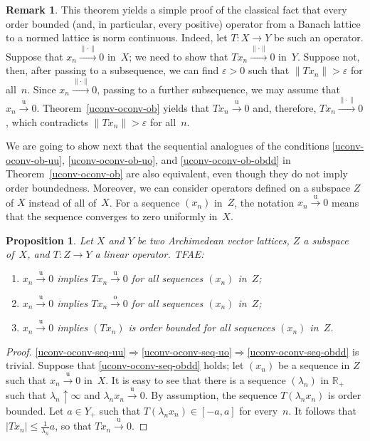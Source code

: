 \documentclass[12pt]{amsart}
\theoremstyle{plain}
\newtheorem{proposition}[theorem]{Proposition}
\theoremstyle{definition}
\newtheorem{remark}[theorem]{Remark}
\newcommand{\abs}[1]{\lvert#1\rvert}
\newcommand{\norm}[1]{\lVert#1\rVert}
\newcommand{\goeso}{\xrightarrow{\mathrm{o}}}	%
\newcommand{\goesu}{\xrightarrow{\mathrm{u}}} %
\newcommand{\goesnorm}{\xrightarrow{\norm{\cdot}}} %
\renewcommand{\le}{\leqslant}
\begin{document}
\begin{remark}\label{uc-bdd}
  This theorem yields a simple proof of the classical fact that every
  order bounded (and, in particular, every positive) operator from a
  Banach lattice to a normed lattice is norm continuous. Indeed, let
  $T\colon X\to Y$ be such an operator. Suppose that $x_n\goesnorm 0$
  in~$X$; we need to show that $Tx_n\goesnorm 0$ in~$Y$. Suppose not,
  then, after passing to a subsequence, we can find $\varepsilon>0$
  such that $\norm{Tx_n}>\varepsilon$ for all~$n$. Since
  $x_n\goesnorm 0$, passing to a further subsequence, we may assume
  that $x_n\goesu 0$. Theorem~\ref{uconv-oconv-ob} yields that
  $Tx_n\goesu 0$ and, therefore, $Tx_n\goesnorm 0$, which contradicts
  $\norm{Tx_n}>\varepsilon$ for all~$n$.
\end{remark}

We are going to show next that the sequential analogues of the
conditions \eqref{uconv-oconv-ob-uu}, \eqref{uconv-oconv-ob-uo}, and
\eqref{uconv-oconv-ob-obdd} in Theorem~\ref{uconv-oconv-ob} are also
equivalent, even though they do not imply order boundedness. Moreover,
we can consider operators defined on a subspace $Z$ of $X$ instead of
all of~$X$. For a sequence $(x_n)$ in~$Z$, the notation $x_n\goesu 0$
means that the sequence converges to zero uniformly in~$X$.

\begin{proposition}\label{uconv-oconv-seq}
  Let $X$ and $Y$ be two Archimedean vector lattices, $Z$ a subspace
  of~$X$, and $T\colon Z\to Y$ a linear operator. TFAE:
  \begin{enumerate}
  \item\label{uconv-oconv-seq-uu} $x_n\goesu 0$ implies
    $Tx_n\goesu 0$ for all sequences $(x_n)$ in~$Z$;
  \item\label{uconv-oconv-seq-uo} $x_n\goesu 0$ implies
    $Tx_n\goeso 0$ for all sequences $(x_n)$ in~$Z$;
  \item\label{uconv-oconv-seq-obdd} $x_n\goesu 0$ implies
    $(Tx_n)$ is order bounded for all sequences $(x_n)$ in~$Z$.
  \end{enumerate}
\end{proposition}

\begin{proof}
  \eqref{uconv-oconv-seq-uu}$\Rightarrow$\eqref{uconv-oconv-seq-uo}$\Rightarrow$\eqref{uconv-oconv-seq-obdd}
  is trivial. Suppose that \eqref{uconv-oconv-seq-obdd} holds; let
  $(x_n)$ be a sequence in $Z$ such that $x_n\goesu 0$ in~$X$. It is easy
  to see that there is a sequence $(\lambda_n)$ in $\mathbb R_+$ such
  that $\lambda_n\uparrow\infty$ and $\lambda_nx_n\goesu 0$. By
  assumption, the sequence $T(\lambda_nx_n)$ is order bounded. Let
  $a\in Y_+$ such that $T(\lambda_nx_n)\in[-a,a]$ for every~$n$. It
  follows that $\abs{Tx_n}\le\frac{1}{\lambda_n}a$, so that
  $Tx_n\goesu 0$.
\end{proof}
\end{document}
